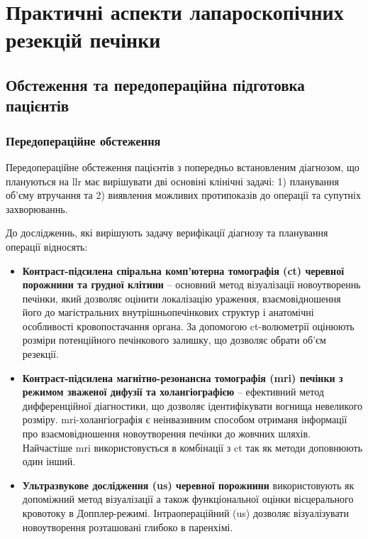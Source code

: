 \chapter{Практичні аспекти лапароскопічних резекцій печінки}
\begin{refsection}

\section{Обстеження та передопераційна підготовка пацієнтів}

\subsection{Передопераційне обстеження}

Передопераційне обстеження пацієнтів з попередньо встановленим діагнозом, що плануються на \acrshort{llr} має вирішувати дві основіні клінічні задачі: 1) планування об'єму втручання та 2) виявлення можливих протипоказів до операції та супутніх захворюваннь. 

До дослідженнь, які вирішують задачу верифікації діагнозу та планування операції відносять:
\begin{itemize}
  
  \item \textbf{Контраст-підсилена спіральна комп'ютерна томографія (\acrshort{ct}) черевної порожнини та грудної клітини} -- основний метод візуалізації новоутвореннь печінки, який дозволяє оцінити локалізацію ураження, взаємовідношення його до магістральних внутрішньопечінкових структур і анатомічні особливості кровопостачання органа. За допомогою \acrshort{ct}-волюметрії оцінюють розміри потенційного печінкового залишку, що дозволяє обрати об'єм резекції. 
  
  \item \textbf{Контраст-підсилена магнітно-резонансна томографія (\acrshort{mri}) печінки з режимом зваженої дифузії та холангіографією} -- ефективний метод дифференційної діагностики, що дозволяє ідентифікувати вогнища невеликого розміру. \acrshort{mri}-холангіографія є неінвазивним способом отриманя інформації про взаємовідношення новоутворення печінки до жовчних шляхів. Найчастіше \acrshort{mri} використовується в комбінації з \acrshort{ct} так як методи доповнюють один інший. 
  
  \item \textbf{Ультразвукове дослідження (\acrshort{us}) черевної порожнини} використовують як допоміжний метод візуалізації а також функціональної оцінки вісцерального кровотоку в Допплер-режимі. Інтраопераційний (\acrshort{us}) дозволяє візуалізувати новоутворення розташовані глибоко в паренхімі.
  

\end{itemize}
\end{refsection}
